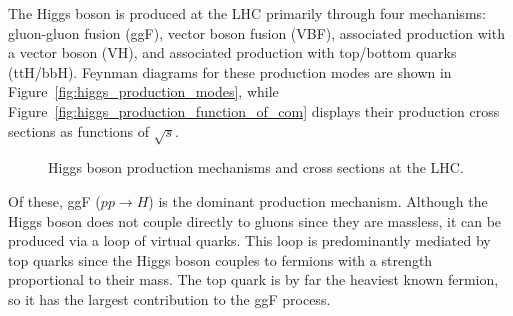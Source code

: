 The Higgs boson is produced at the LHC primarily through four mechanisms: gluon-gluon fusion (ggF), vector boson fusion (VBF), associated production with a vector boson (VH), and associated production with top/bottom quarks (ttH/bbH). Feynman diagrams for these production modes are shown in Figure~\ref{fig:higgs_production_modes}, while Figure~\ref{fig:higgs_production_function_of_com} displays their production cross sections as functions of $\sqrt{s}$. 

\begin{figure}[pht]
  \centering
  \hspace{0.01\textwidth}
  \caption{Higgs boson production mechanisms and cross sections at the LHC.}
\end{figure}

Of these, ggF ($pp \rightarrow H$) is the dominant production mechanism. Although the Higgs boson does not couple directly to gluons since they are massless, it can be produced via a loop of virtual quarks. This loop is predominantly mediated by top quarks since the Higgs boson couples to fermions with a strength proportional to their mass. The top quark is by far the heaviest known fermion, so it has the largest contribution to the ggF process.

